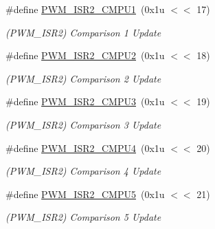 \begin{DoxyCompactItemize}
\mbox{\label{group__SAMS70__PWM_ga0e3b8371adc4fdd3c09e92b64d7f80bf}} 
\#define \mbox{\hyperlink{group__SAMS70__PWM_ga0e3b8371adc4fdd3c09e92b64d7f80bf}{P\+W\+M\+\_\+\+I\+S\+R2\+\_\+\+C\+M\+P\+U1}}~(0x1u $<$$<$ 17)
\begin{DoxyCompactList}\small\item\em (P\+W\+M\+\_\+\+I\+S\+R2) Comparison 1 Update \end{DoxyCompactList}\item 
\mbox{\label{group__SAMS70__PWM_gab580d9ce9fe7ad120ddb0ce37af4a032}} 
\#define \mbox{\hyperlink{group__SAMS70__PWM_gab580d9ce9fe7ad120ddb0ce37af4a032}{P\+W\+M\+\_\+\+I\+S\+R2\+\_\+\+C\+M\+P\+U2}}~(0x1u $<$$<$ 18)
\begin{DoxyCompactList}\small\item\em (P\+W\+M\+\_\+\+I\+S\+R2) Comparison 2 Update \end{DoxyCompactList}\item 
\mbox{\label{group__SAMS70__PWM_gae36833b4a117c2855f8a1f23aa6b7c21}} 
\#define \mbox{\hyperlink{group__SAMS70__PWM_gae36833b4a117c2855f8a1f23aa6b7c21}{P\+W\+M\+\_\+\+I\+S\+R2\+\_\+\+C\+M\+P\+U3}}~(0x1u $<$$<$ 19)
\begin{DoxyCompactList}\small\item\em (P\+W\+M\+\_\+\+I\+S\+R2) Comparison 3 Update \end{DoxyCompactList}\item 
\mbox{\label{group__SAMS70__PWM_gaba0de560e45856c32c10b0f8999d0638}} 
\#define \mbox{\hyperlink{group__SAMS70__PWM_gaba0de560e45856c32c10b0f8999d0638}{P\+W\+M\+\_\+\+I\+S\+R2\+\_\+\+C\+M\+P\+U4}}~(0x1u $<$$<$ 20)
\begin{DoxyCompactList}\small\item\em (P\+W\+M\+\_\+\+I\+S\+R2) Comparison 4 Update \end{DoxyCompactList}\item 
\mbox{\label{group__SAMS70__PWM_ga569332e5e110b0690938fe2dc211fa3c}} 
\#define \mbox{\hyperlink{group__SAMS70__PWM_ga569332e5e110b0690938fe2dc211fa3c}{P\+W\+M\+\_\+\+I\+S\+R2\+\_\+\+C\+M\+P\+U5}}~(0x1u $<$$<$ 21)
\begin{DoxyCompactList}\small\item\em (P\+W\+M\+\_\+\+I\+S\+R2) Comparison 5 Update \end{DoxyCompactList}\item 
$$
\end{DoxyCompactItemize}

